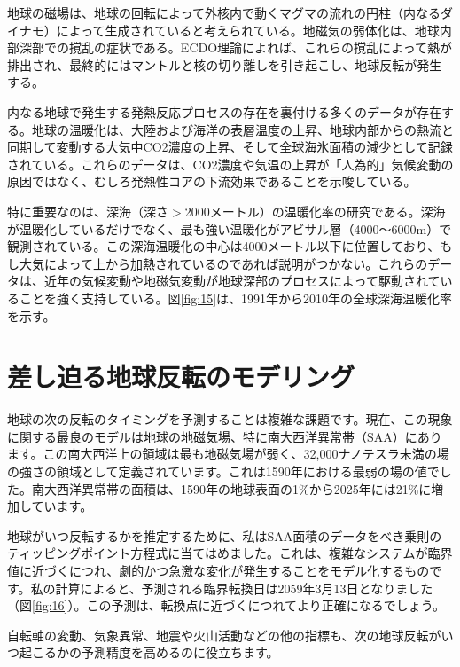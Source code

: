 \documentclass[10pt,twocolumn,letterpaper]{article}
\begin{document}
地球の磁場は、地球の回転によって外核内で動くマグマの流れの円柱（内なるダイナモ）によって生成されていると考えられている\cite{123}。地磁気の弱体化は、地球内部深部での撹乱の症状である。ECDO理論によれば、これらの撹乱によって熱が排出され、最終的にはマントルと核の切り離しを引き起こし、地球反転が発生する\cite{1}。

内なる地球で発生する発熱反応プロセスの存在を裏付ける多くのデータが存在する。地球の温暖化は、大陸および海洋の表層温度の上昇\cite{127,128}、地球内部からの熱流と同期して変動する大気中CO2濃度の上昇\cite{129,130}、そして全球海氷面積の減少\cite{131}として記録されている。これらのデータは、CO2濃度や気温の上昇が「人為的」気候変動の原因ではなく、むしろ発熱性コアの下流効果であることを示唆している\cite{129}。

特に重要なのは、深海（深さ$>$2000メートル）の温暖化率の研究である。深海が温暖化しているだけでなく、最も強い温暖化がアビサル層（4000〜6000m）で観測されている。この深海温暖化の中心は4000メートル以下に位置しており\cite{132,129}、もし大気によって上から加熱されているのであれば説明がつかない。これらのデータは、近年の気候変動や地磁気変動が地球深部のプロセスによって駆動されていることを強く支持している。図\ref{fig:15}は、1991年から2010年の全球深海温暖化率を示す\cite{132}。

\section{差し迫る地球反転のモデリング}

地球の次の反転のタイミングを予測することは複雑な課題です。現在、この現象に関する最良のモデルは地球の地磁気場、特に南大西洋異常帯（SAA）にあります。この南大西洋上の領域は最も地磁気場が弱く、32,000ナノテスラ未満の場の強さの領域として定義されています\cite{135}。これは1590年における最弱の場の値でした。南大西洋異常帯の面積は、1590年の地球表面の1\%から2025年には21\%に増加しています\cite{136}。

地球がいつ反転するかを推定するために、私はSAA面積のデータをべき乗則のティッピングポイント方程式に当てはめました。これは、複雑なシステムが臨界値に近づくにつれ、劇的かつ急激な変化が発生することをモデル化するものです。私の計算によると、予測される臨界転換日は2059年3月13日となりました（図\ref{fig:16}）。この予測は、転換点に近づくにつれてより正確になるでしょう\cite{136}。

自転軸の変動、気象異常、地震や火山活動などの他の指標も、次の地球反転がいつ起こるかの予測精度を高めるのに役立ちます。
\end{document}

